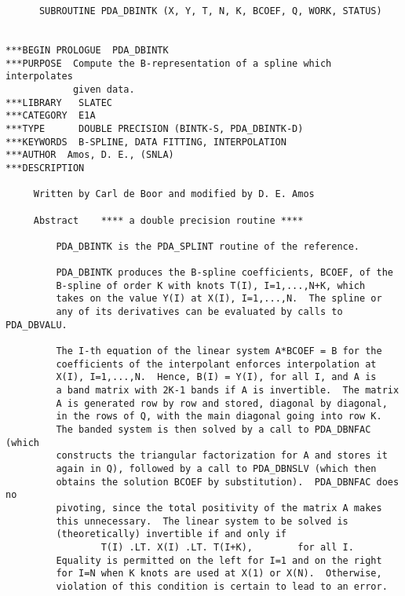 

\begin{verbatim}
      SUBROUTINE PDA_DBINTK (X, Y, T, N, K, BCOEF, Q, WORK, STATUS)


***BEGIN PROLOGUE  PDA_DBINTK
***PURPOSE  Compute the B-representation of a spline which interpolates
            given data.
***LIBRARY   SLATEC
***CATEGORY  E1A
***TYPE      DOUBLE PRECISION (BINTK-S, PDA_DBINTK-D)
***KEYWORDS  B-SPLINE, DATA FITTING, INTERPOLATION
***AUTHOR  Amos, D. E., (SNLA)
***DESCRIPTION

     Written by Carl de Boor and modified by D. E. Amos

     Abstract    **** a double precision routine ****

         PDA_DBINTK is the PDA_SPLINT routine of the reference.

         PDA_DBINTK produces the B-spline coefficients, BCOEF, of the
         B-spline of order K with knots T(I), I=1,...,N+K, which
         takes on the value Y(I) at X(I), I=1,...,N.  The spline or
         any of its derivatives can be evaluated by calls to PDA_DBVALU.

         The I-th equation of the linear system A*BCOEF = B for the
         coefficients of the interpolant enforces interpolation at
         X(I), I=1,...,N.  Hence, B(I) = Y(I), for all I, and A is
         a band matrix with 2K-1 bands if A is invertible.  The matrix
         A is generated row by row and stored, diagonal by diagonal,
         in the rows of Q, with the main diagonal going into row K.
         The banded system is then solved by a call to PDA_DBNFAC (which
         constructs the triangular factorization for A and stores it
         again in Q), followed by a call to PDA_DBNSLV (which then
         obtains the solution BCOEF by substitution).  PDA_DBNFAC does no
         pivoting, since the total positivity of the matrix A makes
         this unnecessary.  The linear system to be solved is
         (theoretically) invertible if and only if
                 T(I) .LT. X(I) .LT. T(I+K),        for all I.
         Equality is permitted on the left for I=1 and on the right
         for I=N when K knots are used at X(1) or X(N).  Otherwise,
         violation of this condition is certain to lead to an error.


\end{verbatim}
